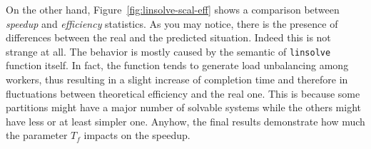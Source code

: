 On the other hand, Figure~\ref{fig:linsolve-scal-eff} shows a comparison
between \emph{speedup} and \emph{efficiency} statistics. As you may
notice, there is the presence of differences between the real and the
predicted situation. Indeed this is not strange at all. The behavior is
mostly caused by the semantic of \texttt{linsolve} function itself. In
fact, the function tends to generate load unbalancing among workers,
thus resulting in a slight increase of completion time and therefore in
fluctuations between theoretical efficiency and the real one. This is
because some partitions might have a major number of solvable systems
while the others might have less or at least simpler one. Anyhow, the
final results demonstrate how much the parameter $T_f$ impacts on the
speedup.

\begin{figure}[!h]
  \\
  \subfigure{
}
\end{figure}
